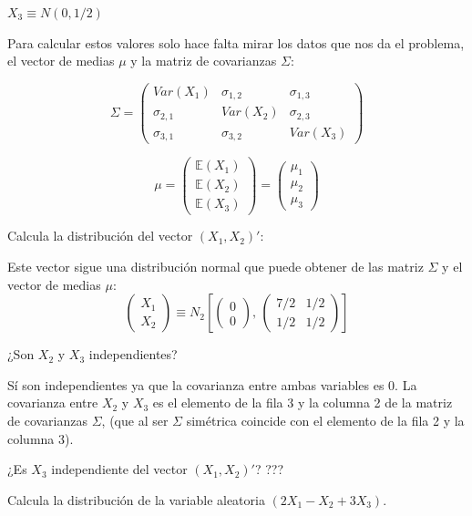 \documentclass[nochap]{apuntes}
\begin{document}
$X_3\equiv N(0, 1/2)$

Para calcular estos valores solo hace falta mirar los datos que nos da el problema, el vector de medias $\mu$ y la matriz de covarianzas $\Sigma$:

\[
\Sigma=\left(
\begin{array}{ccc}
Var(X_1)& \sigma_{1,2}& \sigma_{1,3} \\
\sigma_{2,1}& Var(X_2)& \sigma_{2,3} \\
\sigma_{3,1}& \sigma_{3,2}& Var(X_3)
\end{array}
\right)
\]

\[
\mu=
\left(
\begin{array}{c}
\mathbb{E}(X_1)\\
\mathbb{E}(X_2)\\
\mathbb{E}(X_3)
\end{array}
\right)=
\left(
\begin{array}{c}
\mu_1\\
\mu_2\\
\mu_3
\end{array}
\right)
\]

\ppart Calcula la distribución del vector $(X_1,X_2)'$:

Este vector sigue una distribución normal que puede obtener de las matriz $\Sigma$ y el vector de medias $\mu$:
\[
\left(
\begin{array}{c}
X_1\\
X_2
\end{array}
\right)
\equiv N_2\left[
\left(
\begin{array}{c}
0\\
0
\end{array}
\right)
\text{, }
\left(
\begin{array}{cc}
7/2& 1/2 \\
1/2 & 1/2
\end{array}
\right)
\right]
\]

\ppart ¿Son $X_2$ y $X_3$ independientes?

Sí son independientes ya que la covarianza entre ambas variables es 0. La covarianza entre $X_2$ y $X_3$ es el elemento de la fila 3 y la columna 2 de la matriz de covarianzas $\Sigma$, (que al ser $\Sigma$ simétrica coincide con el elemento de la fila 2 y la columna 3).

\ppart ¿Es $X_3$ independiente del vector $(X_1, X_2)'$?
???

\ppart Calcula la  distribución de la variable aleatoria $(2X_1-X_2+3X_3)$.
\end{document}
